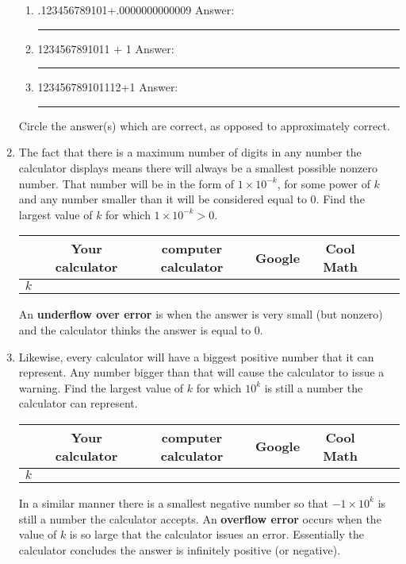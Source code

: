 \documentclass[12pt]{article}%
\newcommand\T{\rule{0pt}{3ex}} %
\newcommand\B{\rule[-1.5ex]{0pt}{0pt}}%
\begin{document}
\begin{enumerate}
\begin{enumerate}
\item .123456789101+.0000000000009  \hspace{20 mm}Answer: \rule{50 mm}{.2pt}
\item 1234567891011 + 1 \hspace{45 mm}Answer: \rule{50 mm}{.2pt}
\item 123456789101112+1 \hspace{43 mm}Answer: \rule{50 mm}{.2pt}
\end{enumerate}
Circle the answer(s) which are correct, as opposed to approximately correct.
\item The fact that there is a maximum number of digits in any number the calculator 
displays means there will always be a smallest possible nonzero number. That number will 
be in the form of $1 \times 10^{-k}$, for some power of $k$ and any number 
smaller than it will be considered equal to $0$. Find the largest value of
$k$ for which $1 \times 10^{-k}>0$. 
 \begin{table}[htbp]
 \centering
 \begin{tabular}{|c|c|c|c|c|c|c|}
\hline
 & \T \B Your calculator & computer calculator & Google & Cool Math\\
\hline
\T \B $k$  & & &  &\\
\hline
\end{tabular}
\end{table}

An \textbf{underflow over error} is when the answer is very small (but nonzero) and 
the calculator thinks the answer is equal to $0$.
\item Likewise, every calculator will have a biggest positive number that it can represent.
Any number bigger than that will cause the calculator to issue a warning. Find the largest
value of $k$ for which $10^k$ is still a number the calculator can represent.
 \begin{table}[htbp]
 \centering
 \begin{tabular}{|c|c|c|c|c|c|c|}
\hline
 & \T \B Your calculator & computer calculator & Google & Cool Math\\
\hline
\T \B $k$  & & &  &\\
\hline
\end{tabular}
\end{table}

In a similar manner there is a smallest negative number so that $-1 \times 10^{k}$ is
still a number the calculator accepts. An \textbf{overflow error} occurs when the value 
of $k$ is so large that the calculator issues an error. Essentially the calculator 
concludes the answer is infinitely positive (or negative).
\end{enumerate}
\end{document}
